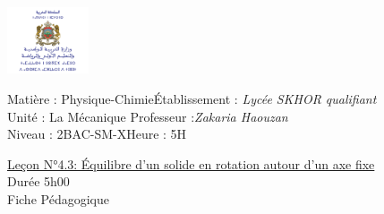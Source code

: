 \documentclass[12pt]{article}
\newcommand\headerMe[2]{\noindent{}#1\hfill#2}
\begin{document}
\begin{center}
\includegraphics[width = 0.18\textwidth]{./img/logoMin.png}
\vspace{-3cm}
\end{center}
\headerMe{Matière : Physique-Chimie}{Établissement : \emph{Lycée SKHOR qualifiant}}\\
\headerMe{ Unité : La Mécanique }{  Professeur :\emph{Zakaria Haouzan}}\\
\headerMe{Niveau : 2BAC-SM-X}{Heure : 5H}\\

\begin{center}
\underline{Leçon N°4.3: Équilibre d’un solide en rotation autour
d’un axe fixe}\\
Durée 5h00
\\
    \vspace{.2cm}
\hrulefill
\Large{Fiche Pédagogique}
\hrulefill\\
\end{center}


\end{document}
